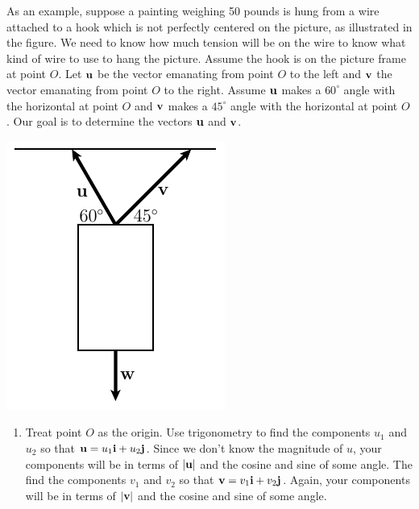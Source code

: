 \begin{enumerate}[leftmargin=0pt]
\begin{minipage}[t]{0.5\linewidth}
    As an example, suppose a painting weighing 50 pounds is hung from a wire attached to a hook which is not perfectly centered on the picture, as illustrated in the figure. We need to know how much tension will be on the wire to know what kind of wire to use to hang the picture. Assume the hook is on the picture frame at point $O$. Let $\mathbf{u}$ be the vector emanating from point $O$ to the left and $\mathbf{v}$ the vector emanating from point $O$ to the right. Assume $\mathbf{u}$ makes a $60^\circ$ angle with the horizontal at point $O$ and $\mathbf{v}$ makes a $45^\circ$ angle with the horizontal at point $O$. Our goal is to determine the vectors $\mathbf{u}$ and $\mathbf{v}$.
    \end{minipage}
    \hfill
    \begin{minipage}[t]{0.4\linewidth}
    \vspace{0pt}
    \includegraphics[width=\linewidth]{../images/fig_9_2_forces.pdf}
    \end{minipage}
    \begin{enumerate}
        \item Treat point $O$ as the origin. Use trigonometry to find the components $u_1$ and $u_2$ so that $\mathbf{u} = u_1 \mathbf{i} + u_2 \mathbf{j}$. Since we don't know the magnitude of $u$, your components will be in terms of $|\mathbf{u}|$ and the cosine and sine of some angle. The find the components $v_1$ and $v_2$ so that $\mathbf{v} =v_1 \mathbf{i} + v_2 \mathbf{j}$. Again, your components will be in terms of $|\mathbf{v}|$ and the cosine and sine of some angle.
        

\end{enumerate}
\end{enumerate}

